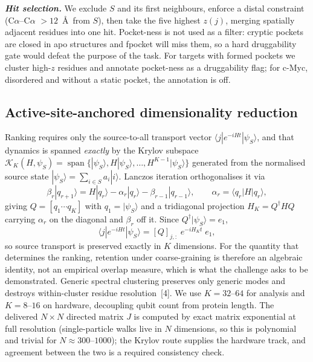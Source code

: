 \documentclass[10pt,a4paper]{article}
\newcommand{\lead}[1]{\textbf{\textit{#1}}}
\begin{document}
\lead{Hit selection.} We exclude $S$ and its first neighbours, enforce a distal constraint
(C$\alpha$--C$\alpha$ $> 12$~\AA\ from $S$), then take the five highest $z(j)$, merging spatially
adjacent residues into one hit. Pocket-ness is not used as a filter: cryptic pockets are closed in apo structures and fpocket will
miss them, so a hard druggability gate would defeat the purpose of the task. For targets with formed pockets we cluster high-$z$ residues and annotate pocket-ness as
a druggability flag; for c-Myc, disordered and without a static pocket, the annotation is off.

\subsection{Active-site-anchored dimensionality reduction}

Ranking requires only the source-to-all transport vector $\langle j|e^{-iHt}|\psi_S\rangle$, and
that dynamics is spanned \emph{exactly} by the Krylov subspace $\mathcal{K}_K(H,\psi_S) =
\operatorname{span}\{|\psi_S\rangle, H|\psi_S\rangle, \dots, H^{K-1}|\psi_S\rangle\}$ generated from
the normalised source state $|\psi_S\rangle = \sum_{i \in S} a_i |i\rangle$. Lanczos iteration
orthogonalises it via
\begin{equation}
\beta_r |q_{r+1}\rangle = H|q_r\rangle - \alpha_r |q_r\rangle - \beta_{r-1}|q_{r-1}\rangle,
\qquad \alpha_r = \langle q_r | H | q_r \rangle,
\end{equation}
giving $Q = [q_1 \cdots q_K]$ with $q_1 = |\psi_S\rangle$ and a tridiagonal projection
$H_K = Q^{\dagger} H Q$ carrying $\alpha_r$ on the diagonal and $\beta_r$ off it. Since
$Q^{\dagger}|\psi_S\rangle = e_1$,
\begin{equation}
\langle j|e^{-iHt}|\psi_S\rangle = [Q]_{j,:}\; e^{-iH_K t}\; e_1 ,
\end{equation}
so source transport is preserved exactly in $K$ dimensions. For the quantity that determines the
ranking, retention under coarse-graining is therefore an algebraic identity, not an empirical overlap
measure, which is what the challenge asks to be demonstrated. Generic spectral clustering
preserves only generic modes and destroys within-cluster residue resolution~[4]. We use $K = 32$--$64$ for analysis and
$K = 8$--$16$ on hardware, decoupling qubit count from protein length. The delivered $N \times N$
directed matrix $J$ is computed by exact matrix exponential at full resolution (single-particle walks
live in $N$ dimensions, so this is polynomial and trivial for $N \approx 300$--$1000$); the Krylov
route supplies the hardware track, and agreement between the two is a required consistency check.
\end{document}
